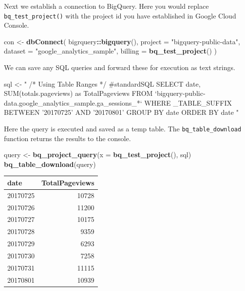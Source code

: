 \documentclass[]{book}
\newenvironment{Shaded}{\begin{snugshade}}{\end{snugshade}}
\newcommand{\DataTypeTok}[1]{\textcolor[rgb]{0.13,0.29,0.53}{#1}}
\newcommand{\KeywordTok}[1]{\textcolor[rgb]{0.13,0.29,0.53}{\textbf{#1}}}
\newcommand{\NormalTok}[1]{#1}
\newcommand{\OperatorTok}[1]{\textcolor[rgb]{0.81,0.36,0.00}{\textbf{#1}}}
\newcommand{\StringTok}[1]{\textcolor[rgb]{0.31,0.60,0.02}{#1}}
\begin{document}
Next we establish a connection to BigQuery. Here you would replace \texttt{bq\_test\_project()}
with the project id you have established in Google Cloud Console.

\begin{Shaded}
\begin{Highlighting}[]
\NormalTok{con <-}\StringTok{ }\KeywordTok{dbConnect}\NormalTok{(}
\NormalTok{  bigrquery}\OperatorTok{::}\KeywordTok{bigquery}\NormalTok{(),}
  \DataTypeTok{project =} \StringTok{"bigquery-public-data"}\NormalTok{,}
  \DataTypeTok{dataset =} \StringTok{"google_analytics_sample"}\NormalTok{,}
  \DataTypeTok{billing =} \KeywordTok{bq_test_project}\NormalTok{()}
\NormalTok{)}
\end{Highlighting}
\end{Shaded}

We can save any SQL queries and forward these for execution as text strings.

\begin{Shaded}
\begin{Highlighting}[]
\NormalTok{sql <-}\StringTok{ "}
\StringTok{  /* Using Table Ranges */}
\StringTok{  #standardSQL}
\StringTok{  SELECT  date, }
\StringTok{        SUM(totals.pageviews) as TotalPageviews}
\StringTok{  }
\StringTok{  FROM  `bigquery-public-data.google_analytics_sample.ga_sessions_*`}
\StringTok{  }
\StringTok{  WHERE _TABLE_SUFFIX BETWEEN '20170725' AND '20170801'}
\StringTok{  }
\StringTok{  GROUP BY date}
\StringTok{  }
\StringTok{  ORDER BY date}
\StringTok{  "}
\end{Highlighting}
\end{Shaded}

Here the query is executed and saved as a temp table. The \texttt{bq\_table\_download}
function returns the results to the console.

\begin{Shaded}
\begin{Highlighting}[]
\NormalTok{query <-}\StringTok{ }\KeywordTok{bq_project_query}\NormalTok{(}\DataTypeTok{x =} \KeywordTok{bq_test_project}\NormalTok{(), sql)}
\KeywordTok{bq_table_download}\NormalTok{(query)}
\end{Highlighting}
\end{Shaded}

\begin{tabular}{l|r}
\hline
date & TotalPageviews\\
\hline
20170725 & 10728\\
\hline
20170726 & 11200\\
\hline
20170727 & 10175\\
\hline
20170728 & 9359\\
\hline
20170729 & 6293\\
\hline
20170730 & 7258\\
\hline
20170731 & 11115\\
\hline
20170801 & 10939\\
\hline
\end{tabular}
\end{document}

